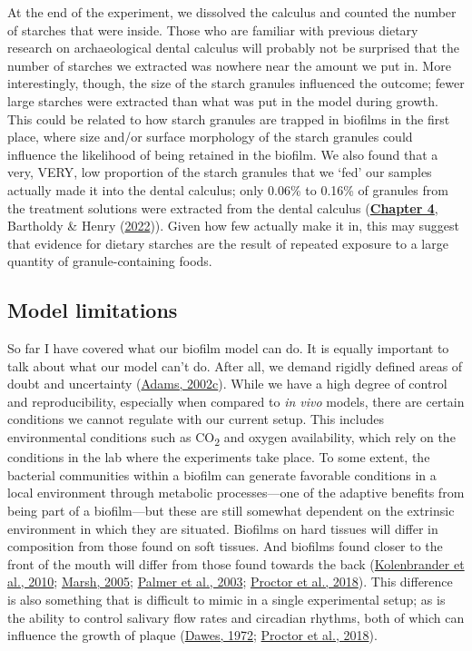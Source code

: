 \documentclass[
  b5paper,
]{book}
\begin{document}
At the end of the experiment, we dissolved the calculus and counted the
number of starches that were inside. Those who are familiar with
previous dietary research on archaeological dental calculus will
probably not be surprised that the number of starches we extracted was
nowhere near the amount we put in. More interestingly, though, the size
of the starch granules influenced the outcome; fewer large starches were
extracted than what was put in the model during growth. This could be
related to how starch granules are trapped in biofilms in the first
place, where size and/or surface morphology of the starch granules could
influence the likelihood of being retained in the biofilm. We also found
that a very, VERY, low proportion of the starch granules that we `fed'
our samples actually made it into the dental calculus; only 0.06\% to
0.16\% of granules from the treatment solutions were extracted from the
dental calculus (\protect\hyperlink{byoc-starch}{\textbf{Chapter 4}},
Bartholdy \& Henry
(\protect\hyperlink{ref-bartholdyInvestigatingBiases2022}{2022})). Given
how few actually make it in, this may suggest that evidence for dietary
starches are the result of repeated exposure to a large quantity of
granule-containing foods.

\hypertarget{disc-model-limitations}{%
\subsection{Model limitations}\label{disc-model-limitations}}

So far I have covered what our biofilm model can do. It is equally
important to talk about what our model can't do. After all, we demand
rigidly defined areas of doubt and uncertainty
(\protect\hyperlink{ref-adamsHitchhikersGuide2002}{Adams, 2002c}). While
we have a high degree of control and reproducibility, especially when
compared to \emph{in vivo} models, there are certain conditions we
cannot regulate with our current setup. This includes environmental
conditions such as CO\textsubscript{2} and oxygen availability, which
rely on the conditions in the lab where the experiments take place. To
some extent, the bacterial communities within a biofilm can generate
favorable conditions in a local environment through metabolic
processes---one of the adaptive benefits from being part of a
biofilm---but these are still somewhat dependent on the extrinsic
environment in which they are situated. Biofilms on hard tissues will
differ in composition from those found on soft tissues. And biofilms
found closer to the front of the mouth will differ from those found
towards the back
(\protect\hyperlink{ref-kolenbranderOralMultispecies2010}{Kolenbrander
et al., 2010}; \protect\hyperlink{ref-marshDentalPlaque2005}{Marsh,
2005};
\protect\hyperlink{ref-palmerCoaggregationInteractions2003}{Palmer et
al., 2003}; \protect\hyperlink{ref-proctorSpatialGradient2018}{Proctor
et al., 2018}). This difference is also something that is difficult to
mimic in a single experimental setup; as is the ability to control
salivary flow rates and circadian rhythms, both of which can influence
the growth of plaque
(\protect\hyperlink{ref-dawesCircadianRhythms1972}{Dawes, 1972};
\protect\hyperlink{ref-proctorSpatialGradient2018}{Proctor et al.,
2018}).
\end{document}
